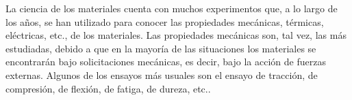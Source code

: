 



La ciencia de los materiales cuenta con muchos experimentos que, a lo largo de los años, se han utilizado para conocer las propiedades mecánicas, térmicas, eléctricas, etc., de los materiales. Las propiedades mecánicas son, tal vez, las más estudiadas, debido a que en la mayoría de las situaciones los materiales se encontrarán bajo solicitaciones mecánicas, es decir, bajo la acción de fuerzas externas. Algunos de los ensayos más usuales son el ensayo de tracción, de compresión, de flexión, de fatiga, de dureza, etc..  

